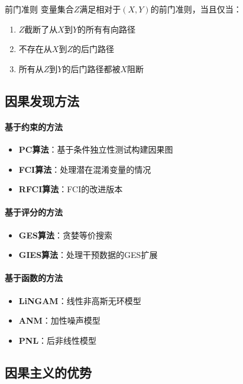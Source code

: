 \begin{definition}[]{前门准则}
变量集合$Z$满足相对于$(X,Y)$的前门准则，当且仅当：
\begin{enumerate}
\item $Z$截断了从$X$到$Y$的所有有向路径
\item 不存在从$X$到$Z$的后门路径
\item 所有从$Z$到$Y$的后门路径都被$X$阻断
\end{enumerate}
\end{definition}

\subsection{因果发现方法}

\paragraph{基于约束的方法}
\begin{itemize}
\item \textbf{PC算法}：基于条件独立性测试构建因果图
\item \textbf{FCI算法}：处理潜在混淆变量的情况
\item \textbf{RFCI算法}：FCI的改进版本
\end{itemize}

\paragraph{基于评分的方法}
\begin{itemize}
\item \textbf{GES算法}：贪婪等价搜索
\item \textbf{GIES算法}：处理干预数据的GES扩展
\end{itemize}

\paragraph{基于函数的方法}
\begin{itemize}
\item \textbf{LiNGAM}：线性非高斯无环模型
\item \textbf{ANM}：加性噪声模型
\item \textbf{PNL}：后非线性模型
\end{itemize}

\subsection{因果主义的优势}

